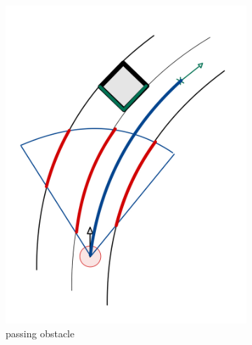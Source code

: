 \begin{figure}
\begin{subfigure}{.3\linewidth}
		\includegraphics[width=\textwidth]{Pictures/passing obstacle}
		\caption{passing obstacle}
	\end{subfigure}
	\begin{subfigure}{.3\linewidth}

\end{subfigure}
\end{figure}
